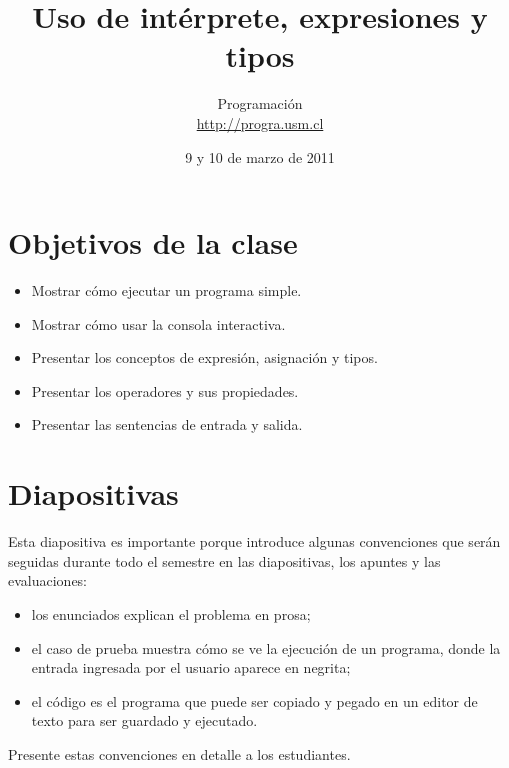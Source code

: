 \documentclass[10pt]{article}
\title{Uso de intérprete, expresiones y tipos}
\author{Programación \\ \url{http://progra.usm.cl}}
\date{9 y 10 de marzo de 2011}
\begin{document}
  \maketitle

  \section*{Objetivos de la clase}
  \begin{itemize}
    \item Mostrar cómo ejecutar un programa simple.
    \item Mostrar cómo usar la consola interactiva.
    \item Presentar los conceptos de expresión, asignación y tipos.
    \item Presentar los operadores y sus propiedades.
    \item Presentar las sentencias de entrada y salida.
  \end{itemize}

  \section*{Diapositivas}


  Esta diapositiva es importante
  porque introduce algunas convenciones
  que serán seguidas durante todo el semestre
  en las diapositivas, los apuntes y las evaluaciones:
  \begin{itemize}
    \item los enunciados explican el problema en prosa;
    \item el caso de prueba muestra cómo se ve la ejecución de un programa,
      donde la entrada ingresada por el usuario aparece en negrita;
    \item el código es el programa que puede ser copiado y pegado
      en un editor de texto para ser guardado y ejecutado.
  \end{itemize}
  Presente estas convenciones en detalle a los estudiantes.
\end{document}
